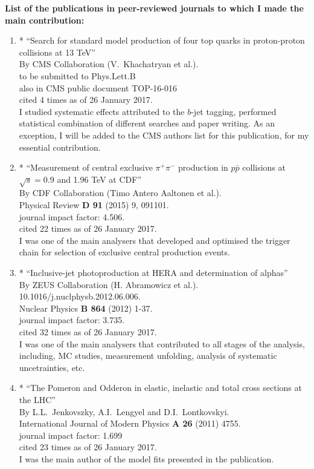 \begin{flushleft}
\textbf{List of the publications in peer-reviewed journals to which I made the main contribution:}\\
\end{flushleft}
\begin{enumerate}
	\item* ``Search for standard model production of four top quarks in proton-proton collisions at 13 TeV''\\
	By CMS Collaboration (V.~Khachatryan et al.).\\
	to be submitted to Phys.Lett.B\\
	also in CMS public document TOP-16-016\\
	cited 4 times as of 26 January 2017.\\
	I studied systematic effects attributed to the $b$-jet tagging, performed statistical combination of different searches and paper writing. As an exception, I will be added to the CMS authors list for this publication, for my essential contribution.
	\item* ``Measurement of central exclusive $\pi^+ \pi^-$ production in $p\bar{p}$ collisions at $\sqrt{s} = 0.9$ and 1.96 TeV at CDF''\\
	By CDF Collaboration (Timo Antero Aaltonen et al.).\\
	Physical Review \textbf{D 91} (2015) 9, 091101. \\
	journal impact factor:  4.506. \\
	cited 22 times as of 26 January 2017.\\
	I was one of the main analysers that developed and optimised the trigger chain for selection of exclusive central production events.
	\item* ``Inclusive-jet photoproduction at HERA and determination of alphas''\\
	By ZEUS Collaboration (H. Abramowicz et al.).\\
	10.1016/j.nuclphysb.2012.06.006.\\
	Nuclear Physics \textbf{B 864} (2012) 1-37.\\
	journal impact factor:  3.735. \\
	cited 32 times as of 26 January 2017. \\
	I was one of the main analysers that contributed to all stages of the analysis, including, MC studies, measurement unfolding, analysis of systematic uncetrainties, etc.
	\item*  ``The Pomeron and Odderon in elastic, inelastic and total cross sections at the LHC''\\
	By  L.L.~Jenkovszky, A.I.~Lengyel and D.I.~Lontkovskyi.\\
    International  Journal of Modern Physics {\bf A 26} (2011) 4755.\\
    journal impact factor:  1.699\\
	cited 23 times as of 26 January 2017. \\
	I was the main author of the model fits presented in the publication.
\end{enumerate}


